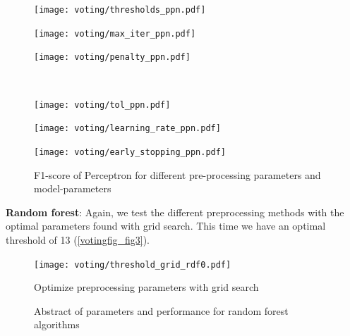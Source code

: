 \documentclass[11pt]{article}
\begin{document}
\begin{figure}
\begin{minipage}[l]{0.3\textwidth}
\texttt{[image: voting/thresholds\_ppn.pdf]}
\end{minipage}
\begin{minipage}[l]{0.3\textwidth}
\texttt{[image: voting/max\_iter\_ppn.pdf]}
\end{minipage}
\begin{minipage}[l]{0.3\textwidth}
\texttt{[image: voting/penalty\_ppn.pdf]}
\end{minipage}\\
\begin{minipage}[t]{0.3\textwidth}
\texttt{[image: voting/tol\_ppn.pdf]}
\end{minipage}
\begin{minipage}[t]{0.3\textwidth}
\texttt{[image: voting/learning\_rate\_ppn.pdf]}
\end{minipage}
\begin{minipage}[t]{0.3\textwidth}
\texttt{[image: voting/early\_stopping\_ppn.pdf]}
\end{minipage}
   \caption{F1-score of Perceptron for different pre-processing parameters and model-parameters}
\label{votingfig_fig2}
\end{figure}

\textbf{Random forest}: Again, we test the different preprocessing methods with the optimal parameters found with grid search. This time we have an optimal threshold of 13 (\ref{votingfig_fig3}). 

\begin{figure}
\begin{minipage}[t]{0.3\textwidth}
\texttt{[image: voting/threshold\_grid\_rdf0.pdf]}
\caption{Optimize preprocessing parameters with grid search}
\label{votingfig_fig3}
\end{minipage}
\begin{minipage}[t]{0.7\textwidth}
\centering
{}
    \caption{Abstract of parameters and performance for random forest algorithms}
    \label{tab_voting1}
\end{minipage}
\end{figure}
\end{document}
